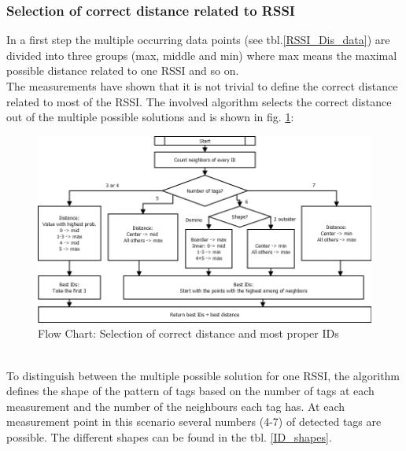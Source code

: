 \subsubsection{Selection of correct distance related to RSSI}
In a first step the multiple occurring data points (see tbl.\ref{RSSI_Dis_data}) are divided into three groups (max, middle and min) where max means the maximal possible distance related to one RSSI and so on.\\ 
The measurements have shown that it is not trivial to define the correct distance related to most of the RSSI. The involved algorithm selects the correct distance out of the multiple possible solutions and is shown in fig. \ref{BestID}:\\
\begin{figure}[!htbp]
\centering
\includegraphics[width = 16cm]{Pictures/BestIDs}
\caption{Flow Chart: Selection of correct distance and most proper IDs}
\label{BestID}
\end{figure}\\
To distinguish between the multiple possible solution for one RSSI, the algorithm defines the shape of the pattern of tags based on the number of tags at each measurement and the number of the neighbours each tag has. At each measurement point in this scenario several numbers (4-7) of detected tags are possible. The different shapes can be found in the tbl. \ref{ID_shapes}.\\
